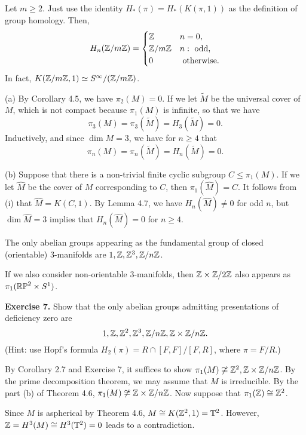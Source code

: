 \documentclass{../../small}
\begin{document}
\begin{lem}
Let $m\ge2$.
Just use the identity $H_*(\pi)=H_*(K(\pi,1))$ as the definition of group homology.
Then,
\[H_n(\mathbb{Z}/m\mathbb{Z})=\begin{cases}\mathbb{Z}&n=0,\\\mathbb{Z}/m\mathbb{Z}&n:\text{ odd,}\\0&\text{ otherwise.}\end{cases}\]
In fact, $K(\mathbb{Z}/m\mathbb{Z},1)\simeq S^\infty/(\mathbb{Z}/m\mathbb{Z})$.
\end{lem}
\begin{pf}
(a)
By Corollary 4.5, we have $\pi_2(M)=0$.
If we let $\tilde M$ be the universal cover of $M$, which is not compact because $\pi_1(M)$ is infinite, so that we have
\[\pi_3(M)=\pi_3(\tilde M)=H_3(\tilde M)=0.\]
Inductively, and since $\dim M=3$, we have for $n\ge4$ that
\[\pi_n(M)=\pi_n(\tilde M)=H_n(\tilde M)=0.\]

(b)
Suppose that there is a non-trivial finite cyclic subgroup $C\le\pi_1(M)$.
If we let $\hat M$ be the cover of $M$ corresponding to $C$, then $\pi_1(\hat M)=C$.
It follows from (i) that $\hat M=K(C,1)$.
By Lemma 4.7, we have $H_n(\hat M)\ne0$ for odd $n$, but $\dim\hat M=3$ implies that $H_n(\hat M)=0$ for $n\ge4$.
\end{pf}
\begin{thm}
The only abelian groups appearing as the fundamental group of closed (orientable) 3-manifolds are $1,\mathbb{Z},\mathbb{Z}^3,\mathbb{Z}/n\mathbb{Z}$.
\end{thm}
\begin{rmk*}
If we also consider non-orientable 3-manifolds, then $\mathbb{Z}\times\mathbb{Z}/2\mathbb{Z}$ also appears as $\pi_1(\mathbb{RP}^2\times S^1)$.
\end{rmk*}

\noindent\textbf{Exercise 7.}
Show that the only abelian groups admitting presentations of deficiency zero are
\[1,\mathbb{Z},\mathbb{Z}^2,\mathbb{Z}^3,\mathbb{Z}/n\mathbb{Z},\mathbb{Z}\times\mathbb{Z}/n\mathbb{Z}.\]
(Hint: use Hopf's formula $H_2(\pi)=R\cap[F,F]/[F,R]$, where $\pi=F/R$.)


\begin{pf}
By Corollary 2.7 and Exercise 7, it suffices to show $\pi_1(M)\not\cong\mathbb{Z}^2,\mathbb{Z}\times\mathbb{Z}/n\mathbb{Z}$.
By the prime decomposition theorem, we may assume that $M$ is irreducible.
By the part (b) of Theorem 4.6, $\pi_1(M)\not\cong\mathbb{Z}\times\mathbb{Z}/n\mathbb{Z}$.
Now suppose that $\pi_1(\mathbb{Z})\cong\mathbb{Z}^2$.

Since $M$ is aspherical by Theorem 4.6, $M\cong K(\mathbb{Z}^2,1)=\mathbb{T}^2$.
However, $\mathbb{Z}=H^3(M)\cong H^3(\mathbb{T}^2)=0$ leads to a contradiction.
\end{pf}
\end{document}
